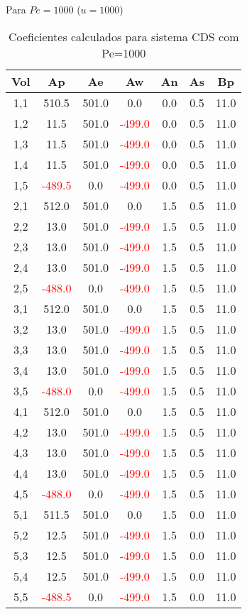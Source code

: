 \documentclass[]{article}
\begin{document}
Para $ Pe = 1000 $ ($u = 1000$)
\begin{table}[H]
	\centering
	\begin{tabular}{|c|c|c|c|c|c|c|}
		\hline
		\textbf{Vol} & \textbf{Ap} & \textbf{Ae} & \textbf{Aw} & \textbf{An} & \textbf{As} & \textbf{Bp} \\
		\hline
		1,1 & 510.5  & 501.0  & 0.0  & 0.0  & 0.5  & 11.0 \\
		1,2 & 11.5   & 501.0  & \textcolor{red}{-499.0} & 0.0  & 0.5  & 11.0 \\
		1,3 & 11.5   & 501.0  & \textcolor{red}{-499.0} & 0.0  & 0.5  & 11.0 \\
		1,4 & 11.5   & 501.0  & \textcolor{red}{-499.0} & 0.0  & 0.5  & 11.0 \\
		1,5 & \textcolor{red}{-489.5}  & 0.0  & \textcolor{red}{-499.0} & 0.0  & 0.5  & 11.0 \\
		2,1 & 512.0  & 501.0  & 0.0  & 1.5  & 0.5  & 11.0 \\
		2,2 & 13.0   & 501.0  & \textcolor{red}{-499.0} & 1.5  & 0.5  & 11.0 \\
		2,3 & 13.0   & 501.0  & \textcolor{red}{-499.0} & 1.5  & 0.5  & 11.0 \\
		2,4 & 13.0   & 501.0  & \textcolor{red}{-499.0} & 1.5  & 0.5  & 11.0 \\
		2,5 & \textcolor{red}{-488.0}  & 0.0  & \textcolor{red}{-499.0} & 1.5  & 0.5  & 11.0 \\
		3,1 & 512.0  & 501.0  & 0.0  & 1.5  & 0.5  & 11.0 \\
		3,2 & 13.0   & 501.0  & \textcolor{red}{-499.0} & 1.5  & 0.5  & 11.0 \\
		3,3 & 13.0   & 501.0  & \textcolor{red}{-499.0} & 1.5  & 0.5  & 11.0 \\
		3,4 & 13.0   & 501.0  & \textcolor{red}{-499.0} & 1.5  & 0.5  & 11.0 \\
		3,5 & \textcolor{red}{-488.0}  & 0.0  & \textcolor{red}{-499.0} & 1.5  & 0.5  & 11.0 \\
		4,1 & 512.0  & 501.0  & 0.0  & 1.5  & 0.5  & 11.0 \\
		4,2 & 13.0   & 501.0  & \textcolor{red}{-499.0} & 1.5  & 0.5  & 11.0 \\
		4,3 & 13.0   & 501.0  & \textcolor{red}{-499.0} & 1.5  & 0.5  & 11.0 \\
		4,4 & 13.0   & 501.0  & \textcolor{red}{-499.0} & 1.5  & 0.5  & 11.0 \\
		4,5 & \textcolor{red}{-488.0}  & 0.0  & \textcolor{red}{-499.0} & 1.5  & 0.5  & 11.0 \\
		5,1 & 511.5  & 501.0  & 0.0  & 1.5  & 0.0  & 11.0 \\
		5,2 & 12.5   & 501.0  & \textcolor{red}{-499.0} & 1.5  & 0.0  & 11.0 \\
		5,3 & 12.5   & 501.0  & \textcolor{red}{-499.0} & 1.5  & 0.0  & 11.0 \\
		5,4 & 12.5   & 501.0  & \textcolor{red}{-499.0} & 1.5  & 0.0  & 11.0 \\
		5,5 & \textcolor{red}{-488.5}  & 0.0  & \textcolor{red}{-499.0} & 1.5  & 0.0  & 11.0 \\
		\hline
	\end{tabular}
	\caption{Coeficientes calculados para sistema CDS com Pe=1000}
\end{table}
\end{document}
